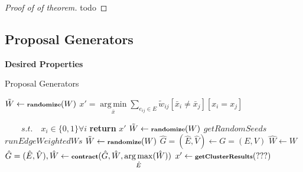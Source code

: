 \documentclass[10pt,twocolumn,letterpaper]{article}
\DeclareMathOperator*{\argmin}{arg\,min}
\DeclareMathOperator*{\argmax}{arg\,max}
\begin{document}
\begin{proof}[Proof of of theorem]
todo
\end{proof}






\subsection{Proposal Generators}

\textbf{Desired Properties}




\begin{algorithm}
    \begin{scriptsize}
        \caption{Proposal Generators}\label{alg:proposal_gen}   
        \begin{algorithmic}[1]
            \State $\tilde{W} \gets \textbf{\scriptsize{randomize}}(W) $
            \State $x'= \argmin\limits_{\bar{x}} \sum\limits_{e_{ij} \in E } \tilde{w}_{ij}[\bar{x}_i \neq \bar{x}_j]  [x_i = x_j]   $

            $ \quad\quad s.t.\quad x_i \in \{0, 1\} \forall i $
            \State \textbf{return} $x'$
            \EndProcedure
            \vspace{0.3cm}
            \State $\tilde{W} \gets \textbf{\scriptsize{randomize}}(W) $
            \State $ getRandomSeeds$
            \State $ runEdgeWeightedWs$
            \EndProcedure   
            \vspace{0.3cm}
            \State $\tilde{W} \gets \textbf{\scriptsize{randomize}}(W) $
            \State $\hat{G}=(\hat{E},\hat{V}) \gets G=(E,V)$
            \State $\hat{W} \gets W$
                \State $\hat{G}=(\hat{E},\hat{V}),\hat{W} \gets 
                    \textbf{\scriptsize{contract}}(\hat{G},\hat{W},  \argmax\limits_{\hat{E}}(\hat{W}) )$
            \EndWhile
            \State $x' \gets \textbf{\scriptsize{getClusterResults}}(???) $ 
            \EndProcedure
        \end{algorithmic}
    \end{scriptsize}
\end{algorithm}
\end{document}
